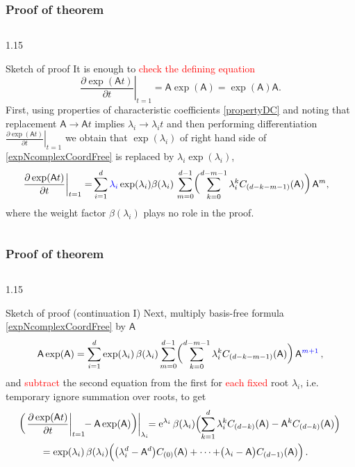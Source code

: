 \documentclass[xcolor=table,hyperref={pdfpagemode=FullScreen}]{beamer}
\newcommand{\ee}{\mathrm{e}} %
\def\m#1{\mathsf{#1}} %
\def\m#1{\mathsf{#1}}%
\newcommand{\red}[1]{\textcolor{red}{#1}}
\newcommand{\blue}[1]{\textcolor{blue}{#1}}
\begin{document}
\begin{frame}
\frametitle<presentation>{Proof of theorem}
\vskip -19pt
\begin{columns}[t]
\begin{column}{1.15\textwidth}
  \begin{block}{Sketch of proof}
    It is enough to \red{check the defining equation}
\begin{equation*}
\left.\frac{\partial\exp(\m{A}t)}{\partial t}\right|_{t=1} = \m{A}
\exp(\m{A})=\exp(\m{A}) \m{A}. 
\end{equation*} 
First, using properties of characteristic coefficients
\eqref{propertyDC} and noting that replacement $\m{A}\to\m{A}t$
implies $\lambda_i\to \lambda_i t$ and then performing differentiation
$\left.\frac{\partial\exp(\m{A}t)}{\partial t}\right|_{t=1}$ we
obtain that $\exp(\lambda_i)$  of right hand side of
\eqref{expNcomplexCoordFree} is replaced by
$\lambda_i\exp(\lambda_i)$,
\begin{align*}
  \left.\frac{\partial\exp(\m{A}t)}{\partial t}\right|_{t=1}=&\sum_{i=1}^{d} \blue{\lambda_i}\exp(\lambda_i)\beta(\lambda_i)\,
  \sum_{m=0}^{d-1} \biggl(\sum_{k=0}^{d-m-1}\lambda_i^k C_{(d-k-m-1)}(\m{A})\biggr)\, \m{A}^{m},
\end{align*}
where the weight factor $\beta(\lambda_i)$ plays no role in
the proof. 
\end{block}
\end{column}
\end{columns}
\end{frame}

\begin{frame}
\frametitle<presentation>{Proof of theorem}
\vskip -19pt
\begin{columns}[t]
\begin{column}{1.15\textwidth}
  \begin{block}{Sketch of proof (continuation I)}
     Next, multiply basis-free formula
\eqref{expNcomplexCoordFree} by $\m{A}$
\begin{align*}
\m{A}\exp(\m{A})=\sum_{i=1}^{d} \exp(\lambda_i)\,\beta(\lambda_i)
  \sum_{m=0}^{d-1} \biggl(\sum_{k=0}^{d-m-1}\lambda_i^k C_{(d-k-m-1)}(\m{A})\biggr)\, \m{A}^{\blue{m+1}}\,,
\end{align*}
    and \red{subtract} the second equation from the first for \red{each fixed}
root $\lambda_i$, i.e. temporary ignore summation over roots, to get
\begin{align*}\label{difFormula}
  &\mkern-8mu  \left.\biggl(\left.\frac{\partial\exp(\m{A}t)}{\partial t}\right|_{t=1}\!\!- \m{A}\exp(\m{A})\biggr)\right|_{\lambda_i}
  \!\!=
  \ee^{\lambda_i}\, \beta(\lambda_i)
  \Bigl(
  \sum_{k=1}^{d} \lambda_i^k C_{(d-k)}(\m{A})-\m{A}^{k} C_{(d-k)}(\m{A})
  \Bigr)\notag\\
  &\qquad  =\exp(\lambda_i) \,\beta(\lambda_i)\Bigl(
  \bigr(\lambda_i^d -\m{A}^{d}\bigr) C_{(0)}(\m{A})+\cdots + \bigr(\lambda_i -\m{A}\bigr) C_{(d-1)}(\m{A})
  \Bigr)\,.
\end{align*}
\end{block}
\end{column}
\end{columns}
\end{frame}
\end{document}
